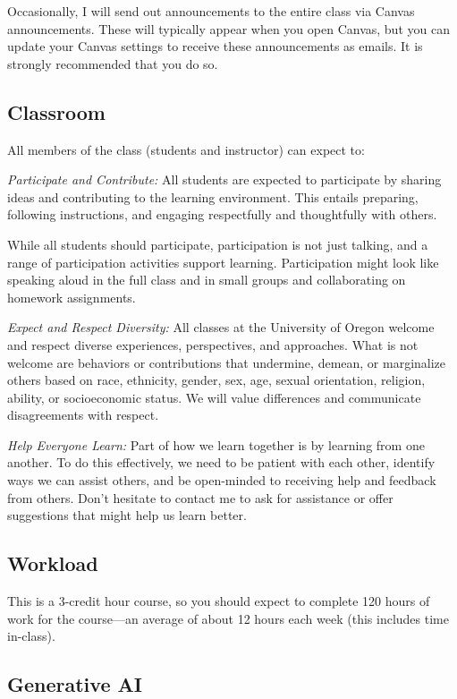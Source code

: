 \documentclass[
]{book}
\begin{document}
Occasionally, I will send out announcements to the entire class via Canvas announcements. These will typically appear when you open Canvas, but you can update your Canvas settings to receive these announcements as emails. It is strongly recommended that you do so.

\subsection{Classroom}\label{classroom}

All members of the class (students and instructor) can expect to:

\emph{Participate and Contribute:} All students are expected to participate by sharing ideas and contributing to the learning environment. This entails preparing, following instructions, and engaging respectfully and thoughtfully with others.

While all students should participate, participation is not just talking, and a range of participation activities support learning. Participation might look like speaking aloud in the full class and in small groups and collaborating on homework assignments.

\emph{Expect and Respect Diversity:} All classes at the University of Oregon welcome and respect diverse experiences, perspectives, and approaches. What is not welcome are behaviors or contributions that undermine, demean, or marginalize others based on race, ethnicity, gender, sex, age, sexual orientation, religion, ability, or socioeconomic status. We will value differences and communicate disagreements with respect.

\emph{Help Everyone Learn:} Part of how we learn together is by learning from one another. To do this effectively, we need to be patient with each other, identify ways we can assist others, and be open-minded to receiving help and feedback from others. Don't hesitate to contact me to ask for assistance or offer suggestions that might help us learn better.

\subsection{Workload}\label{workload}

This is a 3-credit hour course, so you should expect to complete 120 hours of work for the course---an average of about 12 hours each week (this includes time in-class).

\subsection{Generative AI}\label{generative-ai}
\end{document}
